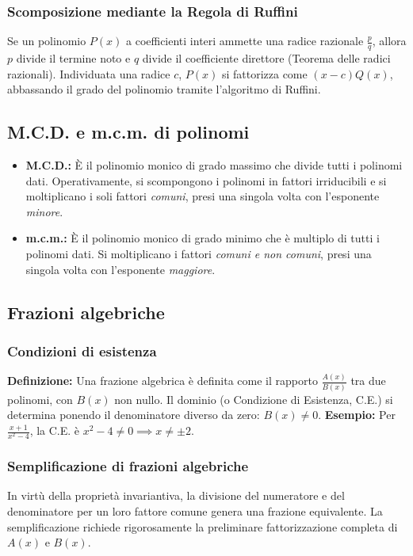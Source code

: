 \subsubsection{Scomposizione mediante la Regola di Ruffini}
Se un polinomio $P(x)$ a coefficienti interi ammette una radice razionale $\frac{p}{q}$, allora $p$ divide il termine noto e $q$ divide il coefficiente direttore (Teorema delle radici razionali). Individuata una radice $c$, $P(x)$ si fattorizza come $(x-c)Q(x)$, abbassando il grado del polinomio tramite l'algoritmo di Ruffini.

\subsection{M.C.D. e m.c.m. di polinomi}
\begin{itemize}
    \item \textbf{M.C.D.:} È il polinomio monico di grado massimo che divide tutti i polinomi dati. Operativamente, si scompongono i polinomi in fattori irriducibili e si moltiplicano i soli fattori \textit{comuni}, presi una singola volta con l'esponente \textit{minore}.
    \item \textbf{m.c.m.:} È il polinomio monico di grado minimo che è multiplo di tutti i polinomi dati. Si moltiplicano i fattori \textit{comuni e non comuni}, presi una singola volta con l'esponente \textit{maggiore}.
\end{itemize}

\subsection{Frazioni algebriche}
\subsubsection{Condizioni di esistenza}
\textbf{Definizione:} Una frazione algebrica è definita come il rapporto $\frac{A(x)}{B(x)}$ tra due polinomi, con $B(x)$ non nullo. Il dominio (o Condizione di Esistenza, C.E.) si determina ponendo il denominatore diverso da zero: $B(x) \neq 0$.
\textbf{Esempio:} Per $\frac{x+1}{x^2 - 4}$, la C.E. è $x^2 - 4 \neq 0 \implies x \neq \pm 2$.

\subsubsection{Semplificazione di frazioni algebriche}
In virtù della proprietà invariantiva, la divisione del numeratore e del denominatore per un loro fattore comune genera una frazione equivalente. La semplificazione richiede rigorosamente la preliminare fattorizzazione completa di $A(x)$ e $B(x)$.

